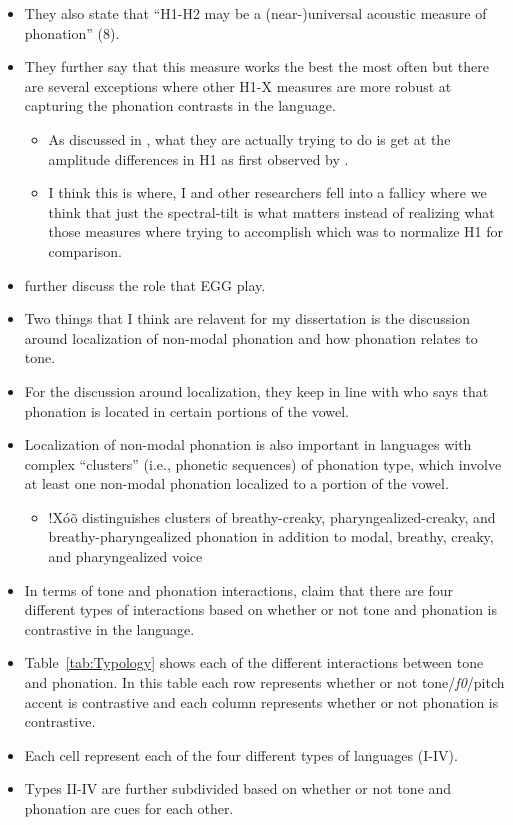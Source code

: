 \begin{itemize}
    \item They also state that ``H1-H2 may be a (near-)universal acoustic measure of phonation'' (8).
    \item They further say that this measure works the best the most often but there are several exceptions where other H1-X measures are more robust at capturing the phonation contrasts in the language. 
    \begin{itemize}
        \item As discussed in \citet{chaiH1H2Acoustic2022}, what they are actually trying to do is get at the amplitude differences in H1 as first observed by \citet{fischer-jorgensenPhoneticAnalysisBreathy1968,laverVoiceQualityIndexical1968}.
        \item I think this is where, I and other researchers fell into a fallicy where we think that just the spectral-tilt is what matters instead of realizing what those measures where trying to accomplish which was to normalize H1 for comparison. 
    \end{itemize}
    \item \citet{espositoCrossLinguisticPatterns2020} further discuss the role that EGG play. 
    \item Two things that I think are relavent for my dissertation is the discussion around localization of non-modal phonation and how phonation relates to tone. 
    \item For the discussion around localization, they keep in line with \citet{silvermanLaryngealComplexityOtomanguean1997} who says that phonation is located in certain portions of the vowel. 
    \item Localization of non-modal phonation is also important in languages with complex ``clusters'' (i.e., phonetic sequences) of phonation type, which involve at least one non-modal phonation localized to a portion of the vowel. 
    \begin{itemize}
        \item !Xóõ distinguishes clusters of breathy-creaky, pharyngealized-creaky, and breathy-pharyngealized phonation in addition to modal, breathy, creaky, and pharyngealized voice
    \end{itemize}
    \item In terms of tone and phonation interactions, \citet{espositoCrossLinguisticPatterns2020} claim that there are four different types of interactions based on whether or not tone and phonation is contrastive in the language. 
    \item Table~\ref{tab:Typology} shows each of the different interactions between tone and phonation. In this table each row represents whether or not tone/\textit{f0}/pitch accent is contrastive and each column represents whether or not phonation is contrastive. 
    \item Each cell represent each of the four different types of languages (I-IV). 
    \item Types II-IV are further subdivided based on whether or not tone and phonation are cues for each other. 
\end{itemize}

